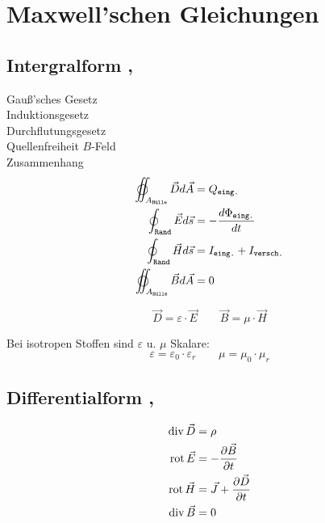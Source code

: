 \section{Maxwell’schen Gleichungen}

\subsection{Intergralform , }
Gauß'sches Gesetz\\
Induktionsgesetz\\
Durchflutungsgesetz\\
Quellenfreiheit $B$-Feld\\
Zusammenhang
\begin{align*}
    \varoiint_{A_\texttt{Hülle}} \vec{D} d \vec{A} & = Q_\texttt{eing.}                      \\
    \oint_\texttt{Rand} \vec{E} d \vec{s}          & = -\dfrac{d\Phi_\texttt{eing.}}{dt}     \\
    \oint_\texttt{Rand} \vec{H} d \vec{s}          & = I_\texttt{eing.} + I_\texttt{versch.} \\
    \varoiint_{A_\texttt{Hülle}} \vec{B} d \vec{A} & = 0
\end{align*}

\[
    \vec{D} = \varepsilon \cdot \vec{E} \qquad
    \vec{B} = \mu \cdot \vec{H}
\]

Bei isotropen Stoffen sind $\varepsilon$ u. $\mu$ Skalare:
\[
    \varepsilon = \varepsilon_0 \cdot \varepsilon_r \qquad \mu = \mu_0 \cdot \mu_r
\]

\subsection{Differentialform , }
\begin{align*}
    \operatorname{div} \vec{D} & = \rho                                           \\
    \operatorname{rot} \vec{E} & = -\dfrac{\partial \vec{B}}{\partial t}          \\
    \operatorname{rot} \vec{H} & = \vec{J} + \dfrac{\partial \vec{D}}{\partial t} \\
    \operatorname{div} \vec{B} & = 0
\end{align*}


